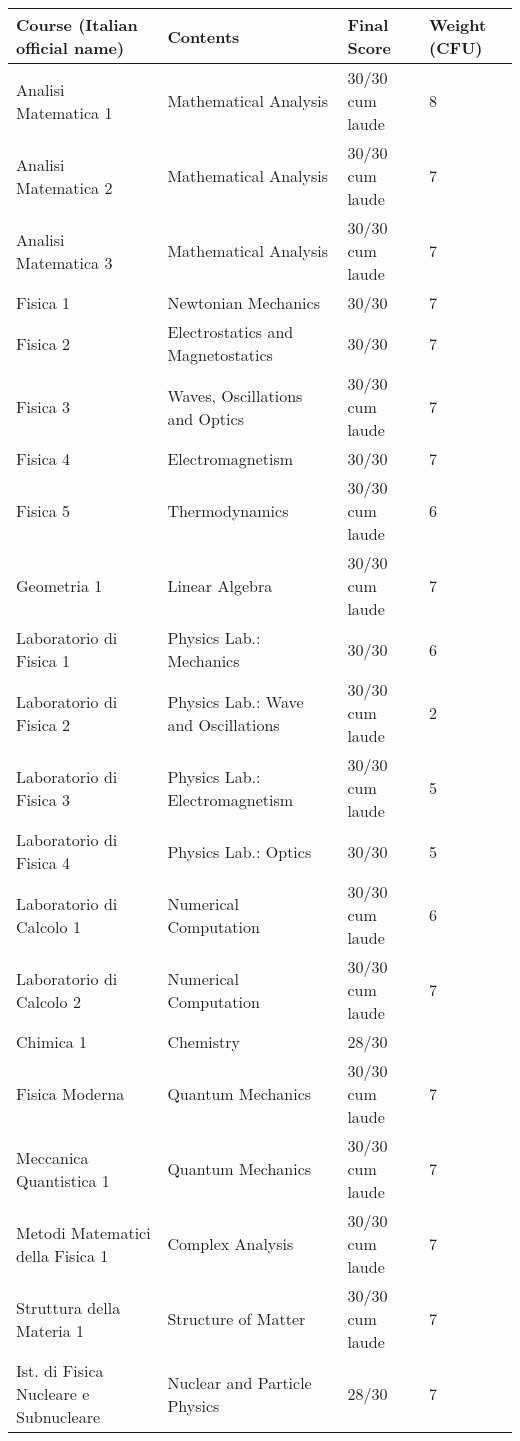 \documentclass[a4paper,10pt,notitlepage]{paper}
\begin{document}
{\centering \footnotesize
\begin{tabular*}{\linewidth}{lll@{\hspace{0.7cm}}l@{\extracolsep{\fill}}}
\bf Course (Italian official name) & \bf Contents  & \bf Final Score &\bf Weight (CFU) \\
\hline \hline
Analisi Matematica 1  					&  Mathematical Analysis	& 30/30 cum laude &8\\	
Analisi Matematica 2  					&  Mathematical Analysis	&  30/30 cum laude &7\\	
Analisi Matematica 3  					&  Mathematical Analysis	& 30/30 cum laude &7\\	
Fisica 1  								&  Newtonian Mechanics& 30/30 &7\\	
Fisica 2  								&  Electrostatics and Magnetostatics &   30/30   &7\\
Fisica 3  								&  Waves, Oscillations and Optics&   30/30 cum laude &7\\		
Fisica 4  								&  Electromagnetism  & 30/30  &7\\	
Fisica 5  								&  Thermodynamics &    30/30 cum laude&6\\	
Geometria	 1							&  Linear Algebra &    30/30 cum laude &7\\		
Laboratorio di Fisica 1					&  Physics Lab.: Mechanics &  30/30 &6\\
Laboratorio di Fisica 2					&  Physics Lab.: Wave and Oscillations&  30/30   cum laude &2\\	
Laboratorio di Fisica 3					&  Physics Lab.: Electromagnetism&   30/30 cum laude  &5\\
Laboratorio di Fisica 4					&  Physics Lab.: Optics&   30/30 &5\\	
Laboratorio di Calcolo 1					&  Numerical Computation&    30/30  cum laude &6\\	
Laboratorio di Calcolo 2					&  Numerical Computation&     30/30 cum laude &7\\	
Chimica 1								&  Chemistry &     28/30\\	
Fisica Moderna 						&  Quantum Mechanics&  30/30  cum laude &7\\	
Meccanica Quantistica 1					&  Quantum Mechanics&   30/30  cum laude &7\\
Metodi Matematici della Fisica 1			&  Complex Analysis &   30/30 cum laude &7\\
Struttura della Materia 1					&  Structure of Matter&  30/30 cum laude  &7\\
Ist. di Fisica Nucleare e Subnucleare			&  Nuclear and Particle Physics& 28/30 &7\\	

\end{tabular*}}
\end{document}
